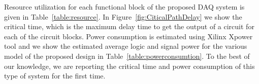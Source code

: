 \documentclass[10pt, conference, compsocconf]{IEEEtran}
\begin{document}
\begin{table}[t!]
\caption{Resource Utilization}
\vspace{-15pt}
\label{table:resource}
\end{table}  
Resource utilization for each functional block of the proposed DAQ system is given in Table~\ref{table:resource}. In Figure~\ref{fig:CiticalPathDelay} we show the critical time, which is the maximum delay time to get the output of a circuit for each of the circuit blocks. Power consumption is estimated using Xilinx Xpower tool and we show the estimated average logic and signal power for the various model of the proposed design in Table~\ref{table:powerconsumtion}. To the best of our knowledge, we are reporting the critical time and power consumption of this type of system for the first time.
\end{document}
